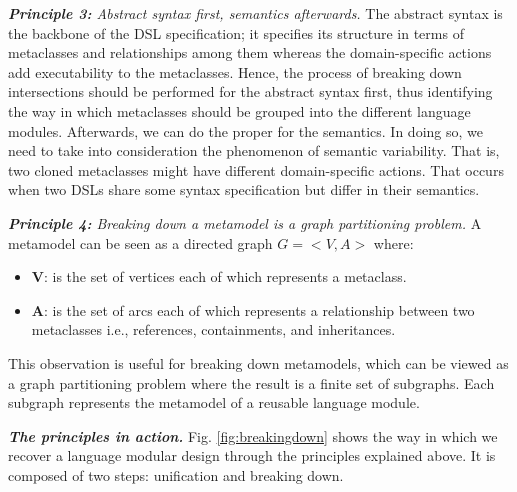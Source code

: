 
\vspace{2mm}
\textit{\textbf{Principle 3:} Abstract syntax first, semantics afterwards.} The abstract syntax is the backbone of the DSL specification; it specifies its structure in terms of metaclasses and relationships among them whereas the domain-specific actions add executability to the metaclasses. Hence, the process of breaking down intersections should be performed for the abstract syntax first, thus identifying the way in which metaclasses should be grouped into the different language modules. Afterwards, we can do the proper for the semantics. In doing so, we need to take into consideration the phenomenon of semantic variability. That is, two cloned metaclasses might have different domain-specific actions. That occurs when two DSLs share some syntax specification but differ in their semantics.

\vspace{2mm}
\textit{\textbf{Principle 4:} Breaking down a metamodel is a graph partitioning problem.} A metamodel can be seen as a directed graph $G=<V,A>$ where:

\begin{itemize}
\item \textbf{V}: is the set of vertices each of which represents a metaclass.
\item \textbf{A}: is the set of arcs each of which represents a relationship between two metaclasses i.e., references, containments, and inheritances.
\end{itemize}

This observation is useful for breaking down metamodels, which can be viewed as a graph partitioning problem where the result is a finite set of subgraphs. Each subgraph represents the metamodel of a reusable language module.

\vspace{2mm}
\textbf{\textit{The principles in action.}} Fig. \ref{fig:breakingdown} shows the way in which we recover a language modular design through the principles explained above. It is composed of two steps: unification and breaking down.

